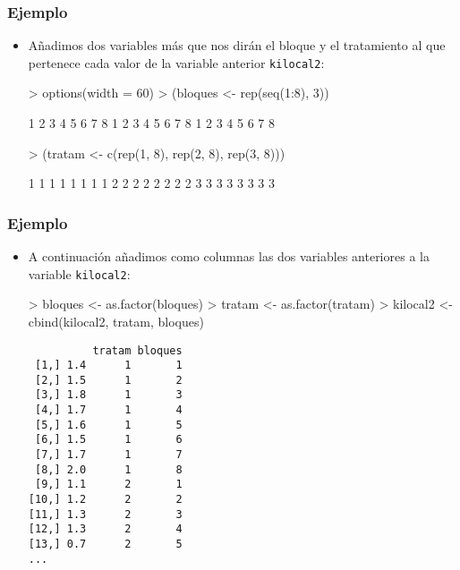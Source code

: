\begin{frame}[fragile]
\frametitle{Ejemplo}
\begin{itemize}
\item<2-> Añadimos dos variables más que nos dirán el bloque y el tratamiento al que pertenece cada valor de la variable anterior {\tt kilocal2}:

\begin{Schunk}
\begin{Sinput}
> options(width = 60)
> (bloques <- rep(seq(1:8), 3))
\end{Sinput}
\begin{Soutput}
 [1] 1 2 3 4 5 6 7 8 1 2 3 4 5 6 7 8 1 2 3 4 5 6 7 8
\end{Soutput}
\begin{Sinput}
> (tratam <- c(rep(1, 8), rep(2, 8), rep(3, 8)))
\end{Sinput}
\begin{Soutput}
 [1] 1 1 1 1 1 1 1 1 2 2 2 2 2 2 2 2 3 3 3 3 3 3 3 3
\end{Soutput}
\end{Schunk}

\end{itemize}
\end{frame}
\begin{frame}[fragile]
\frametitle{Ejemplo}
\begin{itemize}
\item<2-> A continuación añadimos como columnas las dos variables anteriores a la variable {\tt kilocal2}:

{\footnotesize
\begin{Schunk}
\begin{Sinput}
> bloques <- as.factor(bloques)
> tratam <- as.factor(tratam)
> kilocal2 <- cbind(kilocal2, tratam, bloques)
\end{Sinput}
\end{Schunk}

\begin{verbatim}
          tratam bloques
 [1,] 1.4      1       1
 [2,] 1.5      1       2
 [3,] 1.8      1       3
 [4,] 1.7      1       4
 [5,] 1.6      1       5
 [6,] 1.5      1       6
 [7,] 1.7      1       7
 [8,] 2.0      1       8
 [9,] 1.1      2       1
[10,] 1.2      2       2
[11,] 1.3      2       3
[12,] 1.3      2       4
[13,] 0.7      2       5
...
\end{verbatim}}
\end{itemize}
\end{frame}
